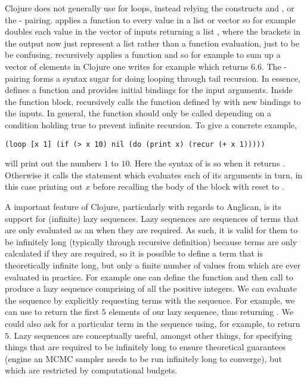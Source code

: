 Clojure does not generally use
for loops, instead relying the constructs \map and \reduce, or the - pairing.
\map applies a function to every value in a list or vector so for example {\small {}}
doubles each value in the vector of inputs returning a list {\small {}}, where the brackets in the output
now just represent a list rather than a function evaluation, just to be be confusing.  \reduce recursively applies
a function and so for example to sum up a vector of elements in Clojure one writes for example
{\small {}} which returns $6.6$.  The - pairing forms
a syntax sugar for doing looping through tail recursion.  In essence,  defines a function and provides
initial bindings for the input arguments.  Inside the  function block,  recursively calls the
function defined by  with new bindings to the inputs.  In general, the  function should
only be called depending on a condition holding true to prevent infinite recursion.  To give a concrete example,
 \begin{lstlisting}[basicstyle=\ttfamily\small,frame=none]
 (loop [x 1] (if (> x 10) nil (do (print x) (recur (+ x 1)))))
 \end{lstlisting}\vspace{-5pt}
will print out the numbers $1$ to $10$.  Here the syntax of  is  so when 
it returns .  Otherwise it calls the  statement which evaluates each of its arguments in turn, in
this case printing out $x$ before recalling the body of the  block with   reset to .

A important feature of Clojure, particularly with regards to Anglican, is its support for (infinite) lazy sequences.
Lazy sequences are sequences of terms that are only evaluated as an when they are required.  As such, it is 
valid for them to be infinitely long (typically through recursive definition) because terms are only calculated if
they are required, so it is possible to define a term that is theoretically infinite long, but only a finite number
of values from which are ever evaluated in practice.    For example one can define the function
 {\small {}} and then call {\small {}} to produce a
lazy sequence comprising of all the positive integers.  We can evaluate the sequence by explicitly requesting
terms with the sequence.  For example, we can use {\small {}} to return the first $5$ elements
of our lazy sequence, thus returning {\small {}}.  We could also ask for a particular term in the
sequence using, for example, {\small {}} to return $5$.
Lazy sequences are conceptually useful, amongst other things, for specifying things that
are required to be infinitely long to ensure theoretical guarantees (engine an MCMC sampler needs to be run
infinitely long to converge), but which are restricted by computational budgets.

